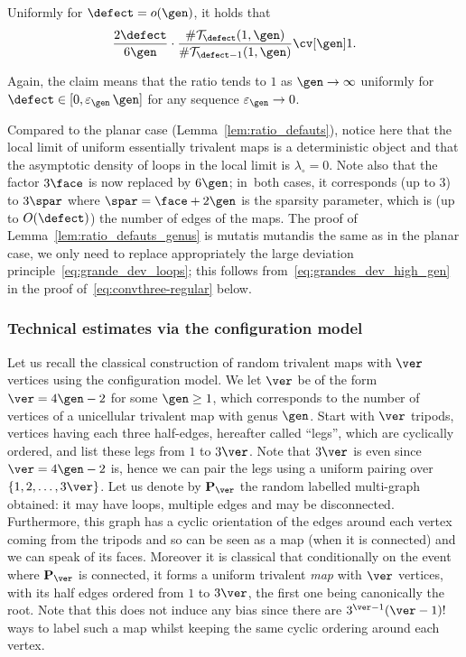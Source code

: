 \begin{lemma}\label{lem:ratio_defauts_genus}
Uniformly for $\defect = o(\gen)$, it holds that
\[
\frac{2 \defect}{6 \gen} \cdot \frac{\#\mathcal{T}_{\defect}(1,\gen)}{\#\mathcal{T}_{\defect-1}(1,\gen)} \cv[\gen] 1.
\]
\end{lemma}

Again, the claim means that the ratio tends to $1$ as $\gen \to \infty$ uniformly for $\defect \in [0, \varepsilon_\gen\, \gen ]$ for any sequence $\varepsilon_\gen \to 0$.

Compared to the planar case (Lemma~\ref{lem:ratio_defauts}), notice here that the local limit of uniform essentially trivalent maps is a deterministic object and that the asymptotic density of loops in the local limit is $\lambda_\circ = 0$. Note also that the factor $3\face$ is now replaced by $6\gen$; in~both cases, it corresponds (up to $3$) to $3\spar$ where $\spar=\face+2\gen$ is the sparsity parameter, which is (up to $O(\defect)$) the number of edges of the maps.
The proof of Lemma~\ref{lem:ratio_defauts_genus} is mutatis mutandis the same as in the planar case, we only need to replace appropriately the large deviation principle~\eqref{eq:grande_dev_loops}; this follows from~\eqref{eq:grandes_dev_high_gen} in the proof of~\eqref{eq:convthree-regular} below.

\subsubsection{Technical estimates via the configuration model}

Let us recall the classical construction of random trivalent maps with $ \ver$ vertices using the configuration model. We let $ \ver$ be of the form $ \ver = 4 \gen -2$ for some $\gen \geq 1$, which corresponds to the number of vertices of a unicellular trivalent map with genus $\gen$.
Start with $ \ver$ tripods, \ie vertices having each three half-edges, hereafter called ``legs'', which are cyclically ordered, and list these legs from $1$ to $3\ver$. Note that $3 \ver$ is even since $ \ver = 4 \gen-2$ is, hence we can pair the legs using a uniform pairing over $\{1,2, \dots, 3 \ver\}$. Let us denote by $\mathbf{P}_{\ver}$ the random labelled multi-graph obtained: it may have loops, multiple edges and may be disconnected. Furthermore, this graph has a cyclic orientation of the edges around each vertex coming from the tripods and so can be seen as a map (when it is connected) and we can speak of its faces. Moreover it is classical that conditionally on the event where $\mathbf{P}_{\ver}$ is connected, it forms a uniform trivalent \emph{map} with $\ver$ vertices, with its half edges ordered from $1$ to $3\ver$, the first one being canonically the root. Note that this does not induce any bias since there are $3^{\ver-1} (\ver-1)!$ ways to label such a map whilst keeping the same cyclic ordering around each vertex.

